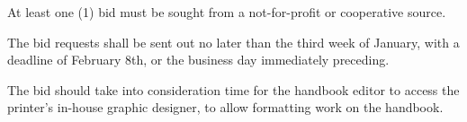 \begin{longenum}[label*=\thesection.\arabic*., align=left]
\begin{longenum} [label*=\arabic*., align=left]
\begin{longenum} [label*=\arabic*., align=left]
	\item At least one (1) bid must be sought from a not-for-profit or cooperative source.
	
	\item The bid requests shall be sent out no later than the third week of January, with a deadline of February 8th, or the business day immediately preceding.
	
	\item The bid should take into consideration time for the handbook editor to access the printer's in-house graphic designer, to allow formatting work on the handbook.
\end{longenum}
\end{longenum}

\end{longenum}
